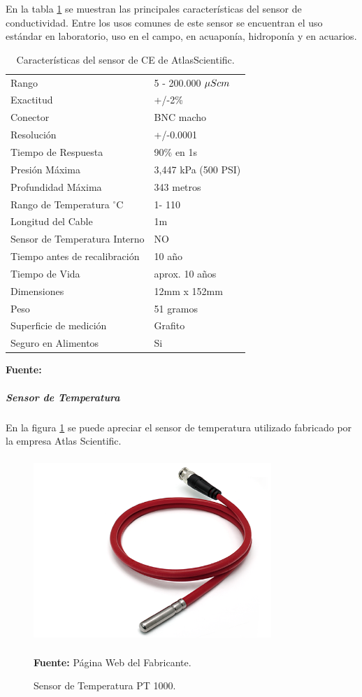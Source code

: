 En la tabla \ref{tab:caract_ce} se muestran las principales caracter\'isticas del sensor de conductividad.
Entre los usos comunes de este sensor se encuentran el uso est\'andar en laboratorio, uso en el campo, en acuapon\'ia, hidropon\'ia y en acuarios.
\begin{table}[H]
\protect\caption[Caracter\'isticas del sensor de CE de Atlas Scientific]{Caracter\'isticas del sensor de CE de AtlasScientific.}
\label{tab:caract_ce}
\begin{center}
\begin{tabular}{l l}
\hline
Rango    &  5 - 200.000 $\mu S\/cm$\\
Exactitud      &  +/-2\% \\
Conector &  BNC macho\\
Resolución   &  +/-0.0001\\
Tiempo de Respuesta   &  90\% en 1s\\
Presión Máxima    &  3,447 kPa (500 PSI) \\
Profundidad Máxima	& 343 metros\\
Rango de Temperatura $^{\circ}$C	& 1- 110\\
Longitud del Cable	& 1m\\
Sensor de Temperatura Interno	& NO\\
Tiempo antes de recalibraci\'on	& 10 año\\
Tiempo de Vida	& aprox. 10 años\\
Dimensiones	& 12mm x 152mm\\
Peso	& 51 gramos\\
Superficie de medición	& Grafito\\
Seguro en Alimentos	& Si\\
\hline
\end{tabular}
\vspace{5mm}
\newline
\hfill \textbf{Fuente:} \cite{atlasce}
\end{center}
\end{table}

\subparagraph{Sensor de Temperatura}
En la figura \ref{fig:4.15}  se puede apreciar el sensor de temperatura utilizado fabricado por la empresa Atlas Scientific.

\begin{figure}[ht]
    \centering
    \includegraphics[width=90mm, height=70mm]{Imagenes/2021/imag39.png}
    \caption[Sensor de Temperatura PT 1000]{Sensor de Temperatura PT 1000. }{\textbf{Fuente:} Página Web del Fabricante. }
    \label{fig:4.15}
\end{figure}

